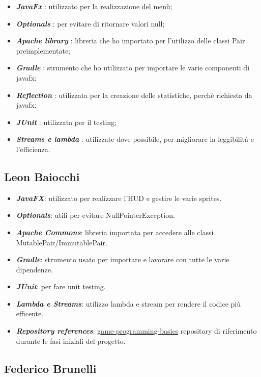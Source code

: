 \begin{itemize}
	\item  \textbf{\textit{JavaFx}} : utilizzato per la realizzazione del menù;
	\item \textbf{\textit{Optionals}} : per evitare di ritornare valori null;
	\item \textbf{\textit{Apache library}} : libreria che ho importato per l'utilizzo delle classi Pair preimplementate;
	\item \textbf{\textit{Gradle}} : strumento che ho utilizzato per importare le varie componenti di javafx;
	\item \textbf{\textit{Reflection}} : utilizzata per la creazione delle statistiche, perchè richiesta da javafx;
	\item \textbf{\textit{JUnit}} : utilizzata per il testing;
	\item \textbf{\textit{Streams e lambda}} : utilizzate dove possibile, per migliorare la leggibilità e l'efficienza.
\end{itemize}

\subsection*{Leon Baiocchi}

\begin{itemize}
	\item \textbf{\textit{JavaFX}}: utilizzato per realizzare l'HUD e gestire le varie sprites.
	\item \textbf{\textit{Optionals}}: utili per evitare NullPointerException.
	\item \textbf{\textit{Apache Commons}}: libreria importata per accedere alle classi MutablePair/ImmutablePair.
	\item \textbf{\textit{Gradle}}: strumento usato per importare e lavorare con tutte le varie dipendenze.
	\item \textbf{\textit{JUnit}}: per fare unit testing.
	\item \textbf{\textit{Lambda e Streams}}: utilizzo lambda e stream per rendere il codice più efficente.
	\item \textbf{\textit{Repository references}}: \href{https://bitbucket.org/aricci303/2021-game-prog-basics/src/master/}{game-programming-basics}
	repository di riferimento durante le fasi iniziali del progetto.
\end{itemize}

\subsection*{Federico Brunelli}

